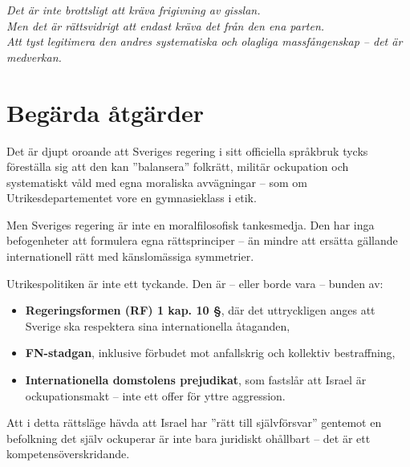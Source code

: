 \documentclass[12pt]{article}
\begin{document}
\textit{Det är inte brottsligt att kräva frigivning av gisslan.}\\
\textit{Men det är rättsvidrigt att endast kräva det från den ena parten.}\\
\textit{Att tyst legitimera den andres systematiska och olagliga massfångenskap – det är medverkan.}




\section{Begärda åtgärder}


Det är djupt oroande att Sveriges regering i sitt officiella språkbruk tycks föreställa sig att den kan ”balansera” folkrätt, militär ockupation och systematiskt våld med egna moraliska avvägningar – som om Utrikesdepartementet vore en gymnasieklass i etik.

Men Sveriges regering är inte en moralfilosofisk tankesmedja. Den har inga befogenheter att formulera egna rättsprinciper – än mindre att ersätta gällande internationell rätt med känslomässiga symmetrier.

Utrikespolitiken är inte ett tyckande. Den är – eller borde vara – bunden av:

\begin{itemize}
  \item \textbf{Regeringsformen (RF) 1 kap. 10 §}, där det uttryckligen anges att Sverige ska respektera sina internationella åtaganden,
  \item \textbf{FN-stadgan}, inklusive förbudet mot anfallskrig och kollektiv bestraffning,
  \item \textbf{Internationella domstolens prejudikat}, som fastslår att Israel är ockupationsmakt – inte ett offer för yttre aggression.
\end{itemize}

Att i detta rättsläge hävda att Israel har ”rätt till självförsvar” gentemot en befolkning det själv ockuperar är inte bara juridiskt ohållbart – det är ett kompetensöverskridande.
\end{document}

